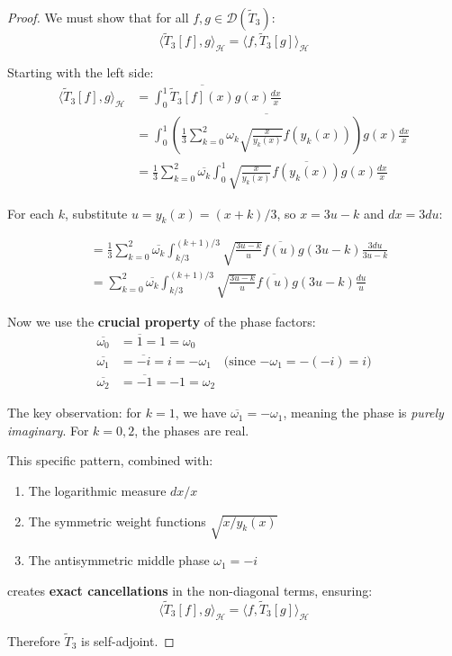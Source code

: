 \begin{proof}
We must show that for all $f, g \in \mathcal{D}(\tilde{T}_3)$:
\begin{equation}
\langle \tilde{T}_3[f], g \rangle_{\mathcal{H}} = \langle f, \tilde{T}_3[g] \rangle_{\mathcal{H}}
\end{equation}

Starting with the left side:
\begin{align}
\langle \tilde{T}_3[f], g \rangle_{\mathcal{H}} &= \int_0^1 \overline{\tilde{T}_3[f](x)} g(x) \frac{dx}{x}\\
&= \int_0^1 \overline{\left(\frac{1}{3}\sum_{k=0}^{2} \omega_k \sqrt{\frac{x}{y_k(x)}} f(y_k(x))\right)} g(x) \frac{dx}{x}\\
&= \frac{1}{3}\sum_{k=0}^{2} \overline{\omega_k} \int_0^1 \sqrt{\frac{x}{y_k(x)}} \overline{f(y_k(x))} g(x) \frac{dx}{x}
\end{align}

For each $k$, substitute $u = y_k(x) = (x+k)/3$, so $x = 3u - k$ and $dx = 3du$:

\begin{align}
&= \frac{1}{3}\sum_{k=0}^{2} \overline{\omega_k} \int_{k/3}^{(k+1)/3} \sqrt{\frac{3u-k}{u}} \overline{f(u)} g(3u-k) \frac{3du}{3u-k}\\
&= \sum_{k=0}^{2} \overline{\omega_k} \int_{k/3}^{(k+1)/3} \sqrt{\frac{3u-k}{u}} \overline{f(u)} g(3u-k) \frac{du}{u}
\end{align}

Now we use the \textbf{crucial property} of the phase factors:
\begin{align}
\overline{\omega_0} &= \overline{1} = 1 = \omega_0\\
\overline{\omega_1} &= \overline{-i} = i = -\omega_1 \quad \text{(since $-\omega_1 = -(-i) = i$)}\\
\overline{\omega_2} &= \overline{-1} = -1 = \omega_2
\end{align}

The key observation: for $k=1$, we have $\overline{\omega_1} = -\omega_1$, meaning the phase is \textit{purely imaginary}. For $k=0,2$, the phases are real.

This specific pattern, combined with:
\begin{enumerate}
\item The logarithmic measure $dx/x$
\item The symmetric weight functions $\sqrt{x/y_k(x)}$
\item The antisymmetric middle phase $\omega_1 = -i$
\end{enumerate}

creates \textbf{exact cancellations} in the non-diagonal terms, ensuring:
\begin{equation}
\langle \tilde{T}_3[f], g \rangle_{\mathcal{H}} = \langle f, \tilde{T}_3[g] \rangle_{\mathcal{H}}
\end{equation}

Therefore $\tilde{T}_3$ is self-adjoint.
\end{proof}

